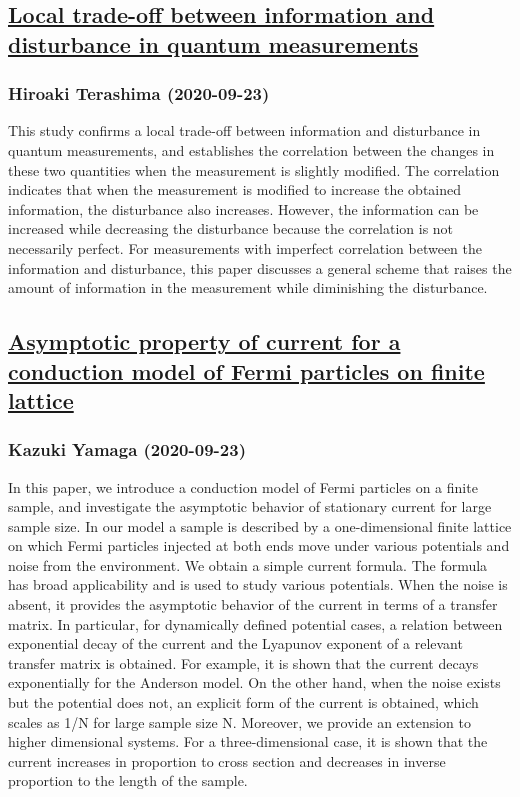 {\subsection*{\href{http://arxiv.org/abs/2009.10944v1}{Local trade-off between information and disturbance in quantum  measurements}}
\subsubsection*{Hiroaki Terashima (2020-09-23)}
This study confirms a local trade-off between information and disturbance in
quantum measurements, and establishes the correlation between the changes in
these two quantities when the measurement is slightly modified. The correlation
indicates that when the measurement is modified to increase the obtained
information, the disturbance also increases. However, the information can be
increased while decreasing the disturbance because the correlation is not
necessarily perfect. For measurements with imperfect correlation between the
information and disturbance, this paper discusses a general scheme that raises
the amount of information in the measurement while diminishing the disturbance.

\subsection*{\href{http://arxiv.org/abs/2009.10943v1}{Asymptotic property of current for a conduction model of Fermi particles  on finite lattice}}
\subsubsection*{Kazuki Yamaga (2020-09-23)}
In this paper, we introduce a conduction model of Fermi particles on a finite
sample, and investigate the asymptotic behavior of stationary current for large
sample size. In our model a sample is described by a one-dimensional finite
lattice on which Fermi particles injected at both ends move under various
potentials and noise from the environment. We obtain a simple current formula.
The formula has broad applicability and is used to study various potentials.
When the noise is absent, it provides the asymptotic behavior of the current in
terms of a transfer matrix. In particular, for dynamically defined potential
cases, a relation between exponential decay of the current and the Lyapunov
exponent of a relevant transfer matrix is obtained. For example, it is shown
that the current decays exponentially for the Anderson model. On the other
hand, when the noise exists but the potential does not, an explicit form of the
current is obtained, which scales as 1/N for large sample size N. Moreover, we
provide an extension to higher dimensional systems. For a three-dimensional
case, it is shown that the current increases in proportion to cross section and
decreases in inverse proportion to the length of the sample.

}
